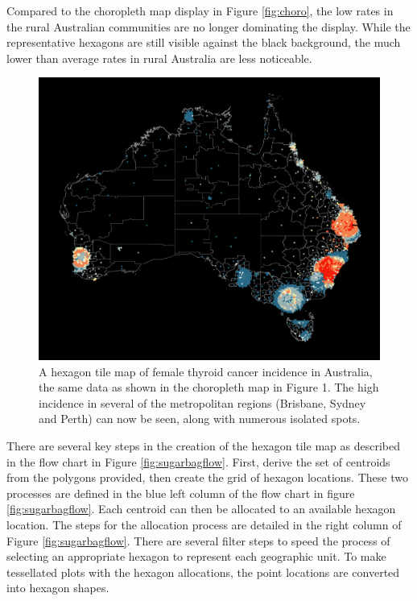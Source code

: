 Compared to the choropleth map display in Figure \ref{fig:choro}, the
low rates in the rural Australian communities are no longer dominating
the display. While the representative hexagons are still visible against
the black background, the much lower than average rates in rural
Australia are less noticeable.

\begin{Schunk}
\begin{figure}
\includegraphics[width=0.95\linewidth]{kobakian-cook_files/figure-latex/hexmap-1} \caption[A hexagon tile map of female thyroid cancer incidence in Australia, the same data as shown in the choropleth map in Figure 1]{A hexagon tile map of female thyroid cancer incidence in Australia, the same data as shown in the choropleth map in Figure 1. The high incidence in several of the metropolitan regions (Brisbane, Sydney and Perth) can now be seen, along with numerous isolated spots.}\label{fig:hexmap}
\end{figure}
\end{Schunk}

There are several key steps in the creation of the hexagon tile map as
described in the flow chart in Figure \ref{fig:sugarbagflow}. First,
derive the set of centroids from the polygons provided, then create the
grid of hexagon locations. These two processes are defined in the blue
left column of the flow chart in figure \ref{fig:sugarbagflow}. Each
centroid can then be allocated to an available hexagon location. The
steps for the allocation process are detailed in the right column of
Figure \ref{fig:sugarbagflow}. There are several filter steps to speed
the process of selecting an appropriate hexagon to represent each
geographic unit. To make tessellated plots with the hexagon allocations,
the point locations are converted into hexagon shapes.

